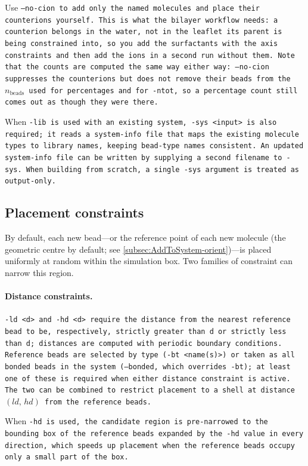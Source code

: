 Use \tt{--no-cion} to add only the named molecules and place their counterions
yourself. This is what the bilayer workflow needs: a counterion belongs in the
water, not in the leaflet its parent is being constrained into, so you add the
surfactants with the axis constraints and then add the ions in a second run
without them. Note that the counts are computed the same way either way:
\tt{--no-cion} suppresses the counterions but does not remove their beads from
the $n_\text{beads}$ used for percentages and for \tt{-ntot}, so a percentage
count still comes out as though they were there.

When \tt{-lib} is used with an existing system, \tt{-sys <input>} is also
required; it reads a system-info file that maps the existing molecule types to
library names, keeping bead-type names consistent. An updated system-info file
can be written by supplying a second filename to \tt{-sys}. When building from
scratch, a single \tt{-sys} argument is treated as output-only.

\subsection{Placement constraints}

By default, each new bead---or the reference point of each new molecule (the
geometric centre by default; see \cref{subsec:AddToSystem-orient})---is placed
uniformly at random within the simulation box. Two families of constraint can
narrow this region.

\paragraph{Distance constraints.}
\tt{-ld <d>} and \tt{-hd <d>} require the distance from the nearest reference
bead to be, respectively, strictly greater than \tt{d} or strictly less than
\tt{d}; distances are computed with periodic boundary conditions. Reference
beads are selected by type (\tt{-bt <name(s)>}) or taken as all bonded beads
in the system (\tt{--bonded}, which overrides \tt{-bt}); at least one of
these is required when either distance constraint is active. The two can be
combined to restrict placement to a shell at distance $(ld,\,hd)$ from the
reference beads.

When \tt{-hd} is used, the candidate region is pre-narrowed to the bounding box
of the reference beads expanded by the \tt{-hd} value in every direction, which
speeds up placement when the reference beads occupy only a small part of the box.

